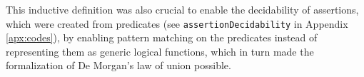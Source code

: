 \begin{itemize}
    This inductive definition was also crucial to enable the decidability of assertions, which were created from predicates (see \verb|assertionDecidability| in Appendix \ref{apx:codes}), by enabling pattern matching on the predicates instead of representing them as generic logical functions, which in turn made the formalization of De Morgan's law of union possible.
    \begin{code}
        \>[2]\AgdaSpace{}%
        \AgdaSpace{}%
        \AgdaSymbol{:}\AgdaSpace{}%
        \AgdaSpace{}%
        \<%
        \\
        \>[2][@{}l@{\AgdaIndent{0}}]%
        \>[4]\AgdaSpace{}%
        \AgdaSymbol{:}\AgdaSpace{}%
        \AgdaSpace{}\<%
        \\
        \>[4]\AgdaSpace{}%
        \AgdaSymbol{:}\AgdaSpace{}%
        \AgdaSpace{}\<%
        \\
        \>[4]\AgdaSpace{}%
        \AgdaSymbol{:}\AgdaSpace{}%
        \AgdaSpace{}%
        \AgdaSpace{}%
        \AgdaSpace{}\<%
        \\
        \>[4]\AgdaSpace{}%
        \AgdaSymbol{:}\AgdaSpace{}%
        \AgdaSpace{}%
        \AgdaSpace{}%
        \AgdaSpace{}%
        \AgdaSpace{}%
        \AgdaSpace{}\<%
        \\
        \>[4]\AgdaSpace{}%
        \AgdaSymbol{:}\AgdaSpace{}%
        \AgdaSpace{}%
        \AgdaSpace{}%
        \AgdaSpace{}%
        \AgdaSpace{}%
        \AgdaSpace{}\<%
        \\
        \\[\AgdaEmptyExtraSkip]%
        \>[4]\AgdaSpace{}%
        \AgdaSymbol{:}\AgdaSpace{}%
        \AgdaSymbol{\{}\AgdaSpace{}%
        \AgdaSymbol{:}\AgdaSpace{}%

\end{code}
\end{itemize}
